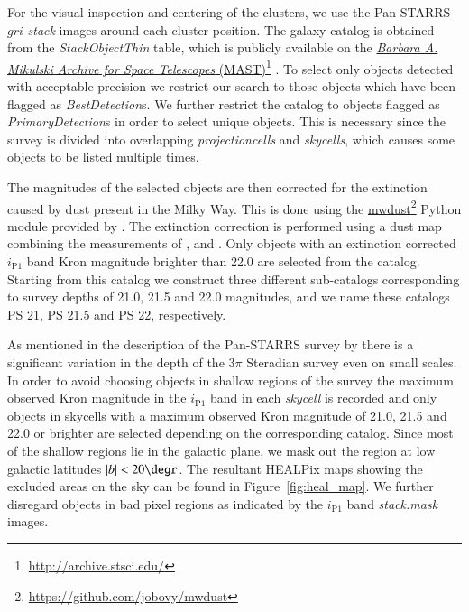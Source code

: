 \documentclass[iop, apjl, twocolappendix, numberedappendix]{emulateapj}
\newcommand\fnurl[2]{%
  \href{#2}{#1}\footnote{\url{#2}}%
}
\begin{document}
For the visual inspection and centering of the clusters, we use the
Pan-STARRS $gri$ \textit{stack} images around each cluster position.
The galaxy catalog is obtained from the  \textit{StackObjectThin}
table, which is publicly available on the \fnurl{\textit{Barbara A.
Mikulski Archive for Space Telescopes}
(MAST)}{http://archive.stsci.edu/}. To select only objects detected
with acceptable precision we restrict our search to those objects
which have been flagged as \textit{BestDetection}s. We further
restrict the catalog to objects flagged as
\textit{PrimaryDetection}s in order to select unique objects. This
is necessary since the survey is divided into overlapping
\textit{projectioncells} and \textit{skycells}, which causes some objects
to be listed multiple times.

The magnitudes of the selected objects are then corrected for the
extinction caused by dust present in the Milky Way. This is done
using the \fnurl{mwdust}{https://github.com/jobovy/mwdust} Python
module provided by \citet{bovy2016galactic}. The extinction
correction is performed using a dust map combining the measurements
of \citet{marshall2006modelling}, \citet{green2015three} and
\citet{drimmel2003three}. Only objects with an extinction corrected
$i_{\mathrm{P1}}$ band Kron magnitude brighter than 22.0 are
selected from the catalog. Starting from this catalog we construct
three different sub-catalogs corresponding to survey depths of 21.0,
21.5 and 22.0 magnitudes, and we name these catalogs PS 21, PS 21.5
and PS 22, respectively.

As mentioned in the description of the Pan-STARRS survey by
\citet{chambers2016pan} there is a significant variation in the
depth of the 3$\pi$ Steradian survey even on small scales. In order
to avoid choosing objects in shallow regions of the survey the
maximum observed Kron magnitude in the $i_{\mathrm{P1}}$ band in
each \textit{skycell} is recorded and only objects in skycells with
a maximum observed Kron magnitude of 21.0, 21.5 and 22.0 or brighter
are selected depending on the corresponding catalog. Since most of
the shallow regions lie in the galactic plane, we mask out the
region at low galactic latitudes $|b|<20\degr$. The resultant
HEALPix maps showing the excluded areas on the sky can be found in
Figure~\ref{fig:heal_map}. We further disregard objects in bad
pixel regions as indicated by the $i_{\mathrm{P1}}$ band
\textit{stack.mask} images.
\end{document}
